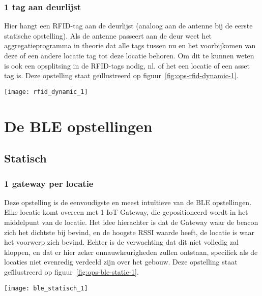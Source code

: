 \subsubsection{1 tag aan deurlijst}
\begin{minipage}{0.65\textwidth}
Hier hangt een RFID-tag aan de deurlijst (analoog aan de antenne bij de eerste statische opstelling). Als de antenne passeert aan de deur weet het aggregatieprogramma in theorie dat alle tags tussen nu en het voorbijkomen van deze of een andere locatie tag tot deze locatie behoren. Om dit te kunnen weten is ook een opsplitsing in de RFID-tags nodig, nl. of het een locatie of een asset tag is. Deze opstelling staat geïllustreerd op figuur~\ref{fig:ops-rfid-dynamic-1}.
\end{minipage}
\hfill
\begin{minipage}{0.30\textwidth}
	\texttt{[image: rfid\_dynamic\_1]}
	\label{fig:ops-rfid-dynamic-1}
\end{minipage}

\section[BLE]{De BLE opstellingen}
\label{sec:ops-ble}

\subsection{Statisch}

\subsubsection{1 gateway per locatie}
\begin{minipage}{0.65\textwidth}
Deze opstelling is de eenvoudigste en meest intuïtieve van de BLE opstellingen. Elke locatie komt overeen met 1 IoT Gateway, die gepositioneerd wordt in het middelpunt van de locatie. Het idee hierachter is dat de Gateway waar de beacon zich het dichtste bij bevind, en de hoogste RSSI waarde heeft, de locatie is waar het voorwerp zich bevind. Echter is de verwachting dat dit niet volledig zal kloppen, en dat er hier zeker onnauwkeurigheden zullen ontstaan, specifiek als de locaties niet evenredig verdeeld zijn over het gebouw. Deze opstelling staat geïllustreerd op figuur~\ref{fig:ops-ble-static-1}.
\end{minipage}
\hfill
\begin{minipage}{0.30\textwidth}
	\texttt{[image: ble\_statisch\_1]}
	\label{fig:ops-ble-static-1}
\end{minipage}

